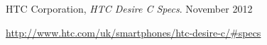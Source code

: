 \begin{thebibliography}{9}
		HTC Corporation,
		\emph{HTC Desire C Specs}.
		November 2012

		\url{http://www.htc.com/uk/smartphones/htc-desire-c/#specs}
\end{thebibliography}
